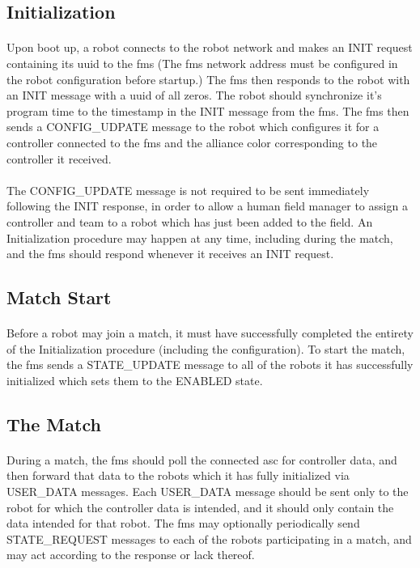 \documentclass[11pt]{article}
\begin{document}
\subsection{Initialization}
\paragraph{}
Upon boot up, a robot connects to the robot network and makes an INIT request containing its \acrfull{uuid} to the \acrfull{fms} 
(The \acrshort{fms} network address must be configured in the robot configuration before startup.) 
The \acrshort{fms} then responds to the robot with an INIT message with a \acrshort{uuid} of all zeros. 
The robot should synchronize it's program time to the timestamp in the INIT message from the \acrshort{fms}.
The \acrshort{fms} then sends a CONFIG\_UDPATE message to the robot which configures it for a controller connected 
to the \acrshort{fms} and the alliance color corresponding to the controller it received. 
\paragraph{}
The CONFIG\_UPDATE message is not required to be sent immediately following the INIT response, 
in order to allow a human field manager to assign a controller and team to a robot which has just been added to the field.
An Initialization procedure may happen at any time, including during the match,
and the \acrshort{fms} should respond whenever it receives an INIT request.

\subsection{Match Start}
\paragraph{}
Before a robot may join a match, it must have successfully completed the entirety of the Initialization procedure 
(including the configuration).  
To start the match, the \acrshort{fms} sends a STATE\_UPDATE message to all of the robots it has successfully initialized 
which sets them to the ENABLED state.

\subsection {The Match}
\paragraph{}
During a match, the \acrshort{fms} should poll the connected \acrfull{asc} for controller data, 
and then forward that data to the robots which it has fully initialized via USER\_DATA messages.
Each USER\_DATA message should be sent only to the robot for which the controller data is intended,
and it should only contain the data intended for that robot.
The \acrshort{fms} may optionally periodically send STATE\_REQUEST messages to each of the robots participating in a match,
and may act according to the response or lack thereof.
\end{document}

